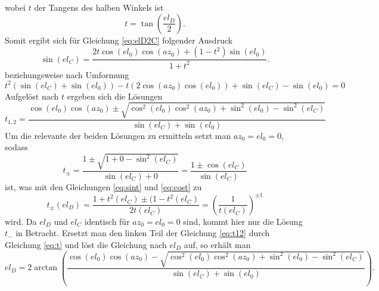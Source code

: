 wobei $t$ der Tangens des halben Winkels ist
\begin{equation}
t=\tan\left(\frac{el_D}{2}\right).
\label{eq:t}
\end{equation}
Somit ergibt sich für Gleichung \ref{eq:elD2C} folgender Ausdruck
\begin{equation}
\sin\left(el_C\right)=\frac{2t\cos\left(el_0\right)\cos\left(az_0\right)+\left(1-t^2\right)\sin\left(el_0 \right)}{1+t^2}.
\end{equation}
beziehungsweise nach Umformung
\begin{equation}
t^2\left(\sin(el_C)+\sin(el_0)\right)-t\left(2\cos(az_0)\cos(el_0)\right)+\sin(el_C)-\sin(el_0)=0
\end{equation}
Aufgelöst nach $t$ ergeben sich die Lösungen
\begin{equation}
t_{1,2}=\frac{\cos\left(el_0\right)\cos\left(az_0\right)\pm\sqrt{\cos^2\left(el_0\right)\cos^2\left(az_0\right)+\sin^2\left(el_0\right)-\sin^2\left(el_C\right)}}{\sin\left(el_C\right)+\sin\left(el_0\right)}
\label{eq:t12}
\end{equation}
Um die relevante der beiden Lösungen zu ermitteln setzt man $az_0=el_0=0$, sodass
\begin{equation}
t_{\pm}=\frac{1\pm\sqrt{1+0-\sin^2\left(el_C\right)}}{\sin\left(el_C\right)+0}=\frac{1\pm\cos\left(el_C\right)}{\sin\left(el_C\right)}
\end{equation}
ist, was mit den Gleichungen \ref{eq:sint} und \ref{eq:cost} zu 
\begin{equation}
t_{\pm}(el_D)=\frac{1+t^2(el_C)\pm(1-t^2(el_C)}{2t(el_C)}=\left(\frac{1}{t(el_C)}\right)^{\pm1}
\end{equation}
wird. Da $el_D$ und $el_C$ identisch für $az_0=el_0=0$ sind, kommt hier nur die Lösung $t_-$ in Betracht. Ersetzt man den linken Teil der Gleichung \ref{eq:t12} durch Gleichung \ref{eq:t} und löst die Gleichung nach $el_D$ auf, so erhält man
\begin{equation}
el_D=2\arctan\left(\frac{\cos(el_0)\cos(az_0)-\sqrt{\cos^2(el_0)\cos^2(az_0)+\sin^2(el_0)-\sin^2(el_C)}}{\sin(el_C)+\sin(el_0)}\right).
\label{eq:elC2D}
\end{equation}
